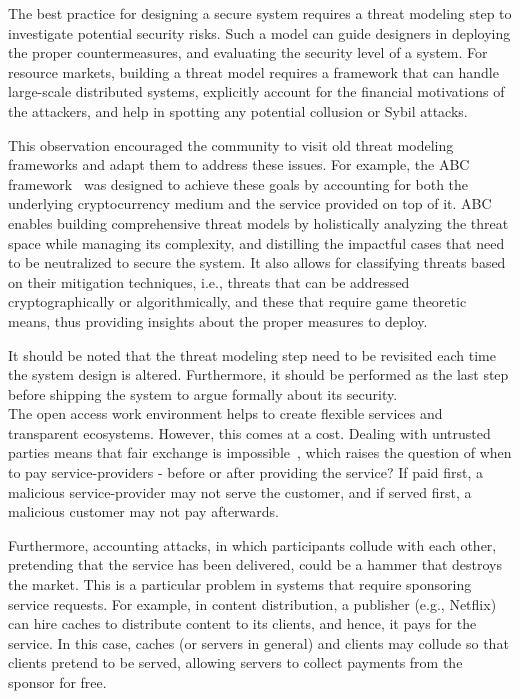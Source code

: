\documentclass{llncs}
\begin{document}
The best practice for designing a secure system requires a threat modeling step to investigate potential security risks. Such a model can guide designers in deploying the proper countermeasures, and evaluating the security level of a system. For resource markets, building a threat model requires a framework that can handle large-scale distributed systems, explicitly account for the financial motivations of the attackers, and help in spotting any potential collusion or Sybil attacks. 


This observation encouraged the community to visit old threat modeling frameworks and adapt them to address these issues. For example, the ABC framework~\cite{Almashaqbeh19} was designed to achieve these goals by accounting for both the underlying cryptocurrency medium and the service provided on top of it. ABC enables building comprehensive threat models by holistically analyzing the threat space while managing its complexity, and distilling the impactful cases that need to be neutralized to secure the system. It also allows for classifying threats based on their mitigation techniques, i.e., threats that can be addressed cryptographically or algorithmically, and these that require game theoretic means, thus providing insights about the proper measures to deploy.


It should be noted that the threat modeling step need to be revisited each time the system design is altered. Furthermore, it should be performed as the last step before shipping the system to argue formally about its security.  \\


 The open access work environment helps to create flexible services and transparent ecosystems. However, this comes at a cost. Dealing with untrusted parties means that fair exchange is impossible~\cite{Even80,Pagnia99}, which raises the question of when to pay service-providers - before or after providing the service? If paid first, a malicious service-provider may not serve the customer, and if served first, a malicious customer may not pay afterwards.
 

Furthermore, accounting attacks, in which participants collude with each other, pretending that the service has been delivered, could be a hammer that destroys the market. This is a particular problem in systems that require sponsoring service requests. For example, in content distribution, a publisher (e.g., Netflix) can hire caches to distribute content to its clients, and hence, it pays for the service. In this case, caches (or servers in general) and clients may collude so that clients pretend to be served, allowing servers to collect payments from the sponsor for free. 
\end{document}
